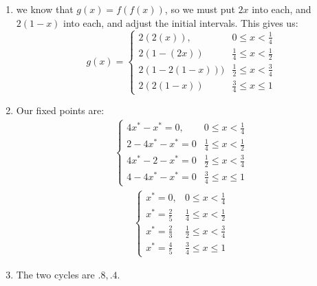 \documentclass[12pt,letterpaper]{article}
\theoremstyle{definition}
\begin{document}
    \begin{changemargin}{.5cm}{0cm}
        \begin{enumerate}[label=(\alph*)]
    \item
    we know that $g(x) = f(f(x))$, so we must put $2x$ into each, and $2(1-x)$ into each, and adjust the initial intervals. This gives us: \begin{equation*}
        g(x) = \begin{cases}
         2(2(x)), & 0\leq x < \frac 1 4\\
         2(1-(2x)) & \frac 1 4 \leq x < \frac 1 2 \\
         2(1-2(1-x))) & \frac 1 2 \leq x < \frac 3 4\\
         2(2(1-x)) & \frac 3 4 \leq x \leq 1
        \end{cases}
    \end{equation*}
    
    
    \item Our fixed points are:
    \begin{align*}
         \begin{cases}
         4x^*-x^*=0, & 0\leq x < \frac 1 4\\
         2-4x^* - x^* = 0 & \frac 1 4 \leq x < \frac 1 2 \\
         4x^*-2 - x^*=0 & \frac 1 2 \leq x < \frac 3 4\\
         4-4x^* -x^*=0 & \frac 3 4 \leq x \leq 1
        \end{cases}
    \end{align*}
    \begin{align*}
         \begin{cases}
         x^*=0, & 0\leq x < \frac 1 4\\
         x^*=\frac 2 5 & \frac 1 4 \leq x < \frac 1 2 \\
         x^*=\frac 2 3  & \frac 1 2 \leq x < \frac 3 4\\
         x^* = \frac 4 5  & \frac 3 4 \leq x \leq 1
        \end{cases}
    \end{align*}
    \item The two cycles are $.8,.4$.
    
\end{enumerate}

    \end{changemargin}


\end{document}
